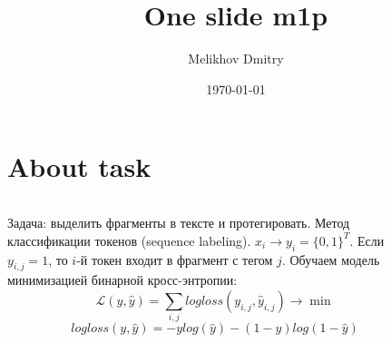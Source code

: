 \documentclass[9pt,pdf,hyperref={unicode}]{beamer}
\title[One slide m1p]{One slide m1p}
\author{Melikhov Dmitry}
\institute[]{MSU}
\date[2022]{\today}
\begin{document}


\section{About task}
\begin{frame}{}
\begin{columns}
\begin{column}{0.4\textwidth}
    Задача: выделить фрагменты в тексте и протегировать.
    Метод классификации токенов (sequence labeling).
    $x_i \rightarrow y_i = \{0, 1\}^T$. Если $y_{i, j} = 1$, то $i$-й токен входит в фрагмент с тегом $j$.
    Обучаем модель минимизацией бинарной кросс-энтропии:
    $$
    \mathcal{L}(y, \hat{y}) = \sum_{i, j} logloss(y_{i, j}, \hat{y}_{i, j}) \rightarrow \min
    $$
    $$
    logloss(y, \hat{y}) = - y log(\hat{y}) - (1 - y) log(1 - \hat{y})
    $$
\end{column}
\begin{column}{0.5\textwidth}
    \begin{figure}
        \centering
        
    \end{figure}
\end{column}
\end{columns}


\end{frame}
\end{document}
